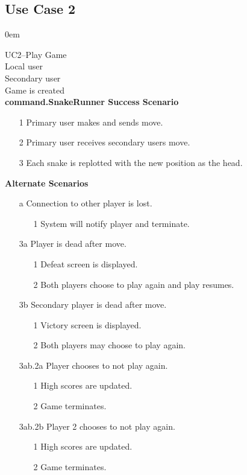 \documentclass[titlepage]{article}
\begin{document}
	\subsection{Use Case 2}
	\itemsep0em 
	
	\textbf{} UC2--Play Game\\
	\textbf{} Local user\\
	\textbf{} Secondary user\\
	\textbf{} Game is created\\
	\textbf{command.SnakeRunner Success Scenario}
	\begin{enumerate}
		\itemsep0em 
		\item[1] Primary user makes and sends move.
		\item[2] Primary user receives secondary users move.
		\item[3] Each snake is replotted with the new position as the head.
	\end{enumerate}
	\textbf{Alternate Scenarios}
	\begin{enumerate}
		\itemsep0em 
		\item[a]Connection to other player is lost.
		\begin{enumerate}
			\itemsep0em 
			\item[1]System will notify player and terminate.
		\end{enumerate}
		\item[3a]Player is dead after move.
		\begin{enumerate}
			\itemsep0em 
			\item[1]Defeat screen is displayed.
			\item[2]Both players choose to play again and play resumes.
		\end{enumerate}
		\item[3b]Secondary player is dead after move.
		\begin{enumerate}
			\itemsep0em 
			\item[1]Victory screen is displayed.
			\item[2]Both players may choose to play again.
		\end{enumerate}
				\item[3ab.2a]Player chooses to not play again.
				\begin{enumerate}
					\itemsep0em 
					\item[1]High scores are updated.
					\item[2]Game terminates.
				\end{enumerate}
				\item[3ab.2b]Player 2 chooses to not play again.
				\begin{enumerate}
					\itemsep0em 
					\item[1]High scores are updated.
					\item[2]Game terminates.
				\end{enumerate}
	\end{enumerate}
		
\end{document}
